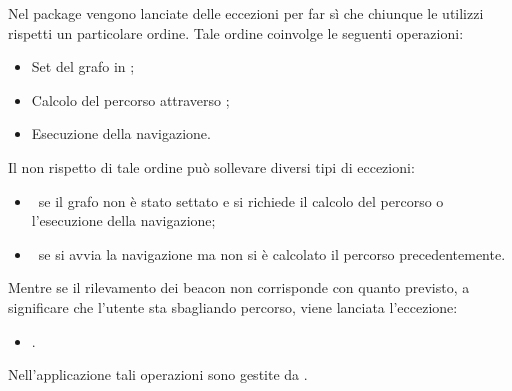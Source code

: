 \documentclass[../Funzionalita.tex]{subfiles}
\begin{document}
			Nel package \navigator vengono lanciate delle eccezioni per far sì che chiunque le utilizzi rispetti un particolare ordine. Tale ordine coinvolge le seguenti operazioni:
			\begin{itemize}
				\item Set del grafo in \NavigatorImp;
				\item Calcolo del percorso attraverso \NavigatorImp;
				\item Esecuzione della navigazione.
			\end{itemize}
			Il non rispetto di tale ordine può sollevare diversi tipi di eccezioni:
			\begin{itemize}
				\item \NoGraphSetException\ se il grafo non è stato settato e si richiede il calcolo del percorso o l'esecuzione della navigazione;
				\item \NoNavigationInformationException\ se si avvia la navigazione ma non si è calcolato il percorso precedentemente.
			\end{itemize}
			Mentre se il rilevamento dei beacon non corrisponde con quanto previsto, a significare che l'utente sta sbagliando percorso, viene lanciata l'eccezione:
			\begin{itemize}
				\item \PathException.
			\end{itemize}
			Nell'applicazione tali operazioni sono gestite da \NavigationManagerImp.
\end{document}
